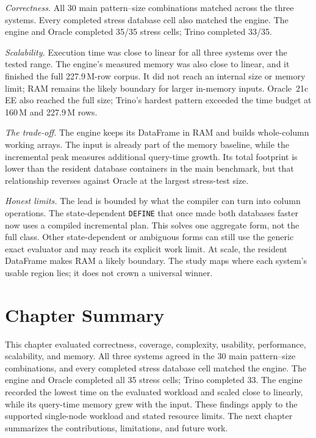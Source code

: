 \emph{Correctness.}  All 30 main pattern--size combinations matched
across the three systems.  Every completed stress database cell also
matched the engine.  The engine and Oracle completed 35/35 stress
cells; Trino completed 33/35.

\emph{Scalability.}  Execution time was close to linear for all three
systems over the tested range.  The engine's measured memory was also
close to linear, and it finished the full 227.9\,M-row corpus.  It did
not reach an internal size or memory limit; RAM remains the likely
boundary for larger in-memory inputs.  Oracle~21c EE also reached the full
size; Trino's hardest pattern exceeded the time budget at 160\,M and
227.9\,M rows.

\emph{The trade-off.}  The engine keeps its DataFrame in RAM and builds
whole-column working arrays.  The input is already part of the memory
baseline, while the incremental peak measures additional query-time
growth.  Its total footprint is lower than
the resident database containers in the main benchmark, but that
relationship reverses against Oracle at the largest stress-test size.

\emph{Honest limits.}  The lead is bounded by what the compiler can
turn into column operations.  The state-dependent \texttt{DEFINE} that
once made both databases faster now uses a compiled incremental plan.
This solves one aggregate form, not the full class.
Other state-dependent or ambiguous forms can still use the generic
exact evaluator and may reach its explicit work limit.  At scale, the
resident DataFrame makes RAM a likely boundary.  The study maps where
each system's usable region lies; it does not crown a universal winner.

\section{Chapter Summary}
\label{sec:eval-summary}

This chapter evaluated correctness, coverage, complexity, usability,
performance, scalability, and memory.  All three systems agreed in the
30 main pattern--size combinations, and every completed stress database
cell matched the engine.  The engine and Oracle completed all 35 stress
cells; Trino completed 33.  The engine recorded the lowest time on the
evaluated workload and scaled close to linearly, while its query-time
memory grew with the input.  These findings apply to the supported
single-node workload and stated resource limits.  The next chapter
summarizes the contributions, limitations, and future work.
